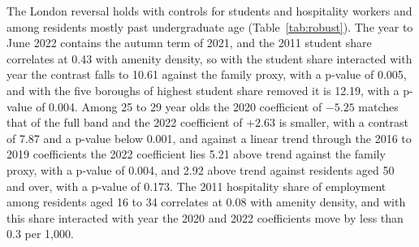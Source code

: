 \documentclass[11pt,a4paper]{article}
\begin{document}
The London reversal holds with controls for students and hospitality workers and among residents mostly past undergraduate age (Table~\ref{tab:robust}). The year to June 2022 contains the autumn term of 2021, and the 2011 student share correlates at 0.43 with amenity density, so with the student share interacted with year the contrast falls to 10.61 against the family proxy, with a p-value of 0.005, and with the five boroughs of highest student share removed it is 12.19, with a p-value of 0.004. Among 25 to 29 year olds the 2020 coefficient of $-5.25$ matches that of the full band and the 2022 coefficient of $+2.63$ is smaller, with a contrast of 7.87 and a p-value below 0.001, and against a linear trend through the 2016 to 2019 coefficients the 2022 coefficient lies 5.21 above trend against the family proxy, with a p-value of 0.004, and 2.92 above trend against residents aged 50 and over, with a p-value of 0.173. The 2011 hospitality share of employment among residents aged 16 to 34 correlates at 0.08 with amenity density, and with this share interacted with year the 2020 and 2022 coefficients move by less than 0.3 per 1,000.
\end{document}
